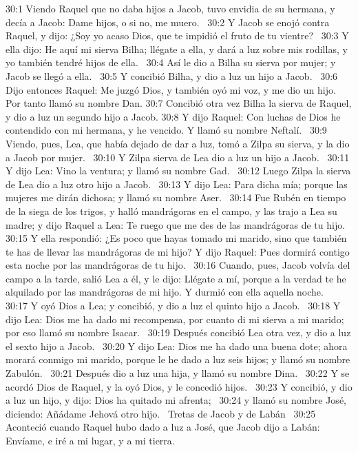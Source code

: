 30:1 Viendo Raquel que no daba hijos a Jacob, tuvo envidia de su hermana, y decía a Jacob: Dame hijos, o si no, me muero.  
30:2 Y Jacob se enojó contra Raquel, y dijo: ¿Soy yo acaso Dios, que te impidió el fruto de tu vientre?  
30:3 Y ella dijo: He aquí mi sierva Bilha; llégate a ella, y dará a luz sobre mis rodillas, y yo también tendré hijos de ella.  
30:4 Así le dio a Bilha su sierva por mujer; y Jacob se llegó a ella.  
30:5 Y concibió Bilha, y dio a luz un hijo a Jacob.  
30:6 Dijo entonces Raquel: Me juzgó Dios, y también oyó mi voz, y me dio un hijo. Por tanto llamó su nombre Dan. 
30:7 Concibió otra vez Bilha la sierva de Raquel, y dio a luz un segundo hijo a Jacob. 
30:8 Y dijo Raquel: Con luchas de Dios he contendido con mi hermana, y he vencido. Y llamó su nombre Neftalí.  
30:9 Viendo, pues, Lea, que había dejado de dar a luz, tomó a Zilpa su sierva, y la dio a Jacob por mujer.  
30:10 Y Zilpa sierva de Lea dio a luz un hijo a Jacob.  
30:11 Y dijo Lea: Vino la ventura; y llamó su nombre Gad.  
30:12 Luego Zilpa la sierva de Lea dio a luz otro hijo a Jacob.  
30:13 Y dijo Lea: Para dicha mía; porque las mujeres me dirán dichosa; y llamó su nombre Aser.  
30:14 Fue Rubén en tiempo de la siega de los trigos, y halló mandrágoras en el campo, y las trajo a Lea su madre; y dijo Raquel a Lea: Te ruego que me des de las mandrágoras de tu hijo. 
30:15 Y ella respondió: ¿Es poco que hayas tomado mi marido, sino que también te has de llevar las mandrágoras de mi hijo? Y dijo Raquel: Pues dormirá contigo esta noche por las mandrágoras de tu hijo.  
30:16 Cuando, pues, Jacob volvía del campo a la tarde, salió Lea a él, y le dijo: Llégate a mí, porque a la verdad te he alquilado por las mandrágoras de mi hijo. Y durmió con ella aquella noche.  
30:17 Y oyó Dios a Lea; y concibió, y dio a luz el quinto hijo a Jacob.  
30:18 Y dijo Lea: Dios me ha dado mi recompensa, por cuanto di mi sierva a mi marido; por eso llamó su nombre Isacar.  
30:19 Después concibió Lea otra vez, y dio a luz el sexto hijo a Jacob.  
30:20 Y dijo Lea: Dios me ha dado una buena dote; ahora morará conmigo mi marido, porque le he dado a luz seis hijos; y llamó su nombre Zabulón.  
30:21 Después dio a luz una hija, y llamó su nombre Dina.  
30:22 Y se acordó Dios de Raquel, y la oyó Dios, y le concedió hijos.  
30:23 Y concibió, y dio a luz un hijo, y dijo: Dios ha quitado mi afrenta;  
30:24 y llamó su nombre José, diciendo: Añádame Jehová otro hijo.  
Tretas de Jacob y de Labán  
30:25 Aconteció cuando Raquel hubo dado a luz a José, que Jacob dijo a Labán: Envíame, e iré a mi lugar, y a mi tierra.  
